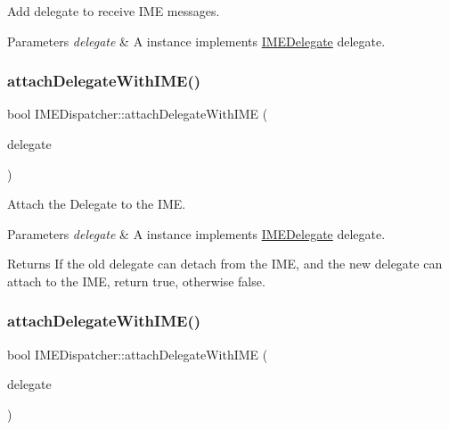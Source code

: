 Add delegate to receive I\+ME messages. 


\begin{DoxyParams}{Parameters}
{\em delegate} & A instance implements \hyperlink{classIMEDelegate}{I\+M\+E\+Delegate} delegate. \\
\hline
\end{DoxyParams}
\mbox{\label{classIMEDispatcher_a5d08b8699ff78fb42b065b4030f8ea11}} 
\subsubsection{\texorpdfstring{attach\+Delegate\+With\+I\+M\+E()}{attachDelegateWithIME()}\hspace{0.1cm}{\footnotesize\ttfamily [1/2]}}
{\footnotesize\ttfamily bool I\+M\+E\+Dispatcher\+::attach\+Delegate\+With\+I\+ME (\begin{DoxyParamCaption}\item[{\hyperlink{classIMEDelegate}{I\+M\+E\+Delegate} $\ast$}]{delegate }\end{DoxyParamCaption})\hspace{0.3cm}{\ttfamily [protected]}}



Attach the Delegate to the I\+ME. 


\begin{DoxyParams}{Parameters}
{\em delegate} & A instance implements \hyperlink{classIMEDelegate}{I\+M\+E\+Delegate} delegate. \\
\hline
\end{DoxyParams}
\begin{DoxyReturn}{Returns}
If the old delegate can detach from the I\+ME, and the new delegate can attach to the I\+ME, return true, otherwise false. 
\end{DoxyReturn}
\mbox{\label{classIMEDispatcher_a5d08b8699ff78fb42b065b4030f8ea11}} 
\subsubsection{\texorpdfstring{attach\+Delegate\+With\+I\+M\+E()}{attachDelegateWithIME()}\hspace{0.1cm}{\footnotesize\ttfamily [2/2]}}
{\footnotesize\ttfamily bool I\+M\+E\+Dispatcher\+::attach\+Delegate\+With\+I\+ME (\begin{DoxyParamCaption}\item[{\hyperlink{classIMEDelegate}{I\+M\+E\+Delegate} $\ast$}]{delegate }\end{DoxyParamCaption})\hspace{0.3cm}{\ttfamily [protected]}}



